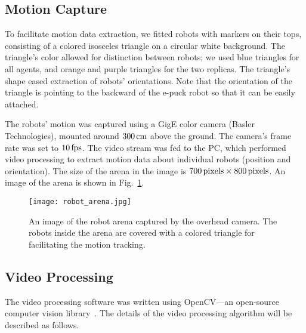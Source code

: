 \subsection{Motion Capture}

To facilitate motion data extraction, we fitted robots with markers on their tops, consisting of a colored isosceles triangle on a circular white background. The triangle's color allowed for distinction between robots; we used blue triangles for all agents, and orange and purple triangles for the two replicas. The triangle's shape eased extraction of robots' orientations. Note that the orientation of the triangle is pointing to the backward of the e-puck robot so that it can be easily attached.

The robots' motion was captured using a GigE color camera (Basler Technologies), mounted around $\unit[300]{cm}$ above the ground. The camera's frame rate was set to $\unit[10]{fps}$. The video stream was fed to the PC, which performed video processing to extract motion data about individual robots (position and orientation). The size of the arena in the image is 
$\unit[700]{pixels} \times \unit[800]{pixels}$. An image of the arena is shown in Fig.~\ref{fig:robot_arena}.
%
\begin{figure}[!t]
    \centering
    \texttt{[image: robot\_arena.jpg]}
    \caption{An image of the robot arena captured by the overhead camera. The robots inside the arena are covered with a colored triangle for facilitating the motion tracking.}
    \label{fig:robot_arena}
\end{figure} 
%
\subsection{Video Processing}

The video processing software was written using OpenCV---an open-source computer vision library~\cite{Gary2008}. The details of the video processing algorithm will be described as follows. 

